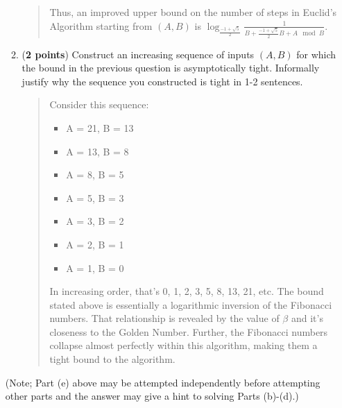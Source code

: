 \documentclass[11pt]{article}
\begin{document}
\begin{enumerate}[leftmargin=*]
\begin{enumerate}
\begin{quote}
      Thus, an improved upper bound on the number of steps in Euclid's Algorithm starting from $(A, B)$ is $\log_{\frac{-1 + \sqrt{5}}{2}}\frac{1}{B + \frac{-1 + \sqrt{5}}{2} B + A \mod B}$. 
      \end{quote}
    \item (\textbf{2 points}) Construct an increasing sequence of inputs $(A,B)$ for which the bound in the previous question is asymptotically tight. Informally justify why the sequence you constructed is tight in 1-2 sentences.
      \begin{quote}
        \color{purple}
        Consider this sequence:
        \begin{itemize}
          \item A = 21, B = 13
          \item A = 13, B = 8 
          \item A = 8, B = 5 
          \item A = 5, B = 3 
          \item A = 3, B = 2 
          \item A = 2, B = 1 
          \item A = 1, B = 0 
        \end{itemize}
        In increasing order, that's 0, 1, 2, 3, 5, 8, 13, 21, etc. The bound stated above is essentially a logarithmic inversion of the Fibonacci numbers. That relationship is revealed by the value of $\beta$ and it's closeness to the Golden Number. Further, the Fibonacci numbers collapse almost perfectly within this algorithm, making them a tight bound to the algorithm.
      \end{quote}
\end{enumerate}
(Note; Part (e) above may be attempted independently before attempting other parts and the answer may give a hint to solving Parts (b)-(d).)



\end{enumerate}
\end{document}
